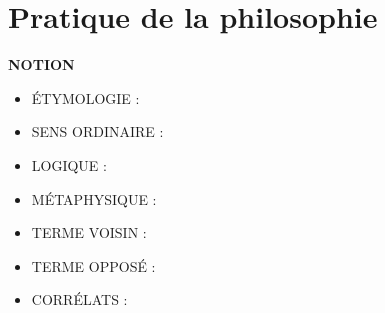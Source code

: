 
\section{Pratique de la philosophie}
{\bf N{\footnotesize OTION}}

\begin{itemize}[leftmargin=1cm, label=, itemsep=1pt]
\item {\footnotesize ÉTYMOLOGIE} : 
\item {\footnotesize SENS ORDINAIRE} : 
\item {\footnotesize LOGIQUE} : 
\item {\footnotesize MÉTAPHYSIQUE} : 
\end{itemize}

 

\begin{itemize}[leftmargin=1cm, label=, itemsep=1pt]
\item {\footnotesize TERME VOISIN} : 
\item {\footnotesize TERME OPPOSÉ} : 
\item {\footnotesize CORRÉLATS} : 
\end{itemize}


